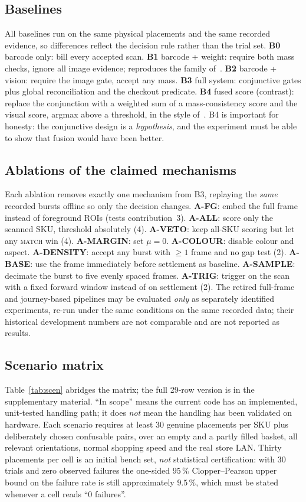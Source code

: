 \documentclass[conference]{IEEEtran}
\begin{document}
\subsection{Baselines}
All baselines run on the same physical placements and the same recorded evidence, so differences
reflect the decision rule rather than the trial set. \textbf{B0} barcode only: bill every accepted
scan. \textbf{B1} barcode + weight: require both mass checks, ignore all image evidence; reproduces
the family of~\cite{R02}. \textbf{B2} barcode + vision: require the image gate, accept any mass.
\textbf{B3} full system: conjunctive gates plus global reconciliation and the checkout predicate.
\textbf{B4} fused score (contrast): replace the conjunction with a weighted sum of a mass-consistency
score and the visual score, argmax above a threshold, in the style of~\cite{R01}. B4 is important for
honesty: the conjunctive design is a \emph{hypothesis}, and the experiment must be able to show that
fusion would have been better.

\subsection{Ablations of the claimed mechanisms}
Each ablation removes exactly one mechanism from B3, replaying the \emph{same} recorded bursts offline
so only the decision changes. \textbf{A-FG}: embed the full frame instead of foreground ROIs
(tests contribution~3). \textbf{A-ALL}: score only the scanned SKU, threshold absolutely (4).
\textbf{A-VETO}: keep all-SKU scoring but let any \textsc{match} win (4). \textbf{A-MARGIN}: set
$\mu{=}0$. \textbf{A-COLOUR}: disable colour and aspect. \textbf{A-DENSITY}: accept any burst with
$\ge1$ frame and no gap test (2). \textbf{A-BASE}: use the frame immediately before settlement as
baseline. \textbf{A-SAMPLE}: decimate the burst to five evenly spaced frames. \textbf{A-TRIG}: trigger
on the scan with a fixed forward window instead of on settlement (2). The retired full-frame and
journey-based pipelines may be evaluated \emph{only} as separately identified experiments, re-run under
the same conditions on the same recorded data; their historical development numbers are not comparable
and are not reported as results.

\subsection{Scenario matrix}
Table~\ref{tab:scen} abridges the matrix; the full 29-row version is in the supplementary material.
``In scope'' means the current code has an implemented, unit-tested handling path; it does \emph{not}
mean the handling has been validated on hardware. Each scenario requires at least 30 genuine
placements per SKU plus deliberately chosen confusable pairs, over an empty and a partly filled
basket, all relevant orientations, normal shopping speed and the real store LAN. Thirty placements per
cell is an initial bench set, \emph{not} statistical certification: with 30 trials and zero observed
failures the one-sided $95\,\%$ Clopper--Pearson upper bound on the failure rate is still
approximately $9.5\,\%$, which must be stated whenever a cell reads ``0 failures''.
\end{document}
